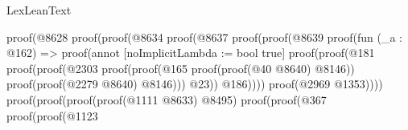 \begin{lexlean}{LexLeanText}
\begin{coremodule}
                                                                      proof(@8628
                                                                          proof(proof(@8634
                                                                                proof(@8637
                                                                                    proof(proof(@8639
                                                                                          proof(fun (_a : @162) =>
                                                                                            proof(annot [noImplicitLambda := bool true]
                                                                                              proof(proof(@181
                                                                                                    proof(proof(@2303
                                                                                                          proof(proof(@165
                                                                                                                proof(proof(@40
                                                                                                                      @8640)
                                                                                                                    @8146))
                                                                                                              proof(proof(@2279
                                                                                                                    @8640)
                                                                                                                  @8146)))
                                                                                                        @23))
                                                                                                  @186))))
                                                                                        proof(@2969
                                                                                            @1353))))
                                                                              proof(proof(proof(proof(@1111
                                                                                        @8633)
                                                                                      @8495)
                                                                                    proof(proof(@367
                                                                                          proof(proof(@1123

\end{coremodule}
\end{lexlean}
